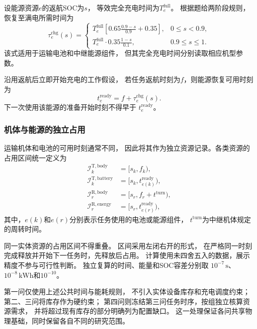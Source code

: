 \documentclass[bwprint]{gmcmthesis}
\begin{document}
设能源资源$e$的返航SOC为$s$，
等效完全充电时间为$T_e^{\mathrm{full}}$。
根据题给两阶段规则，恢复至满电所需时间为
\begin{equation}
    \tau_e^{\mathrm{chg}}(s)
    =
    \begin{cases}
        T_e^{\mathrm{full}}
        \left[
        0.65\displaystyle\frac{0.9-s}{0.9}+0.35
        \right],
        & 0\leq s<0.9,\\[8pt]
        T_e^{\mathrm{full}}
        \cdot0.35\displaystyle\frac{1-s}{0.1},
        & 0.9\leq s\leq1.
    \end{cases}
\end{equation}
该式适用于运输电池和中继能源组件，
但其完全充电时间分别读取相应机型参数。

沿用返航后立即开始充电的工作假设，
若任务返航时刻为$f$，则能源恢复可用时刻为
\begin{equation}
    t_e^{\mathrm{ready}}
    =
    f+\tau_e^{\mathrm{chg}}(s).
\end{equation}
下一次使用该能源的准备开始时刻不得早于
$t_e^{\mathrm{ready}}$。

\subsubsection{机体与能源的独立占用}

运输机体和电池的可用时刻通常不同，
因此将其作为独立资源记录。各类资源的占用区间统一定义为
\begin{align}
    \mathcal{I}_k^{\mathrm{T,body}}
    &=[s_k,f_k),\\
    \mathcal{I}_k^{\mathrm{T,battery}}
    &=[s_k,t_{e(k)}^{\mathrm{ready}}),\\
    \mathcal{I}_r^{\mathrm{R,body}}
    &=[s_r,f_r+t^{\mathrm{turn}}),\\
    \mathcal{I}_r^{\mathrm{R,energy}}
    &=[s_r,t_{e(r)}^{\mathrm{ready}}),
\end{align}
其中，$e(k)$和$e(r)$分别表示任务使用的电池或能源组件，
$t^{\mathrm{turn}}$为中继机体规定的周转时间。

同一实体资源的占用区间不得重叠。
区间采用左闭右开的形式，
在严格同一时刻完成释放并开始下一任务时，先释放后占用。
计算使用未四舍五入的数据，展示精度不参与可行性判断。
独立复算的时间、能量和SOC容差分别取
$10^{-7}\,\mathrm{s}$、
$10^{-8}\,\mathrm{kWh}$和$10^{-10}$。

第一问仅使用上述公共时间与能耗规则，
不引入实体设备库存和充电调度约束；
第二、三问将库存作为硬约束；
第四问则冻结第三问任务时序，按组独立核算资源需求，
并将超过现有库存的部分明确列为配置缺口。
这一处理保证各问共享物理基础，同时保留各自不同的研究范围。
\end{document}
